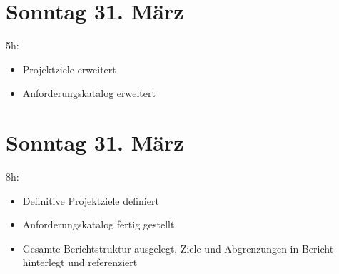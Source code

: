 \section{Sonntag 31. März}\label{sonntag-31.muxe4rz}

5h:

\begin{itemize}
  \tightlist
  \item
        Projektziele erweitert
  \item
        Anforderungskatalog erweitert
\end{itemize}

\section{Sonntag 31. März}\label{sonntag-31.muxe4rz}

8h:

\begin{itemize}
  \tightlist
  \item
        Definitive Projektziele definiert
  \item
        Anforderungskatalog fertig gestellt
  \item
        Gesamte Berichtstruktur ausgelegt, Ziele und Abgrenzungen in Bericht
        hinterlegt und referenziert
\end{itemize}
